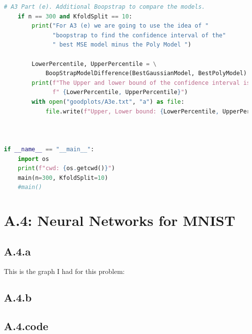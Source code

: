 \documentclass[]{article}
\begin{document}
\begin{lstlisting}[language=python]
    # A3 Part (e). Additional Boopstrap to compare the models.
    if n == 300 and KfoldSplit == 10:
        print("For A3 (e) we are going to use the idea of "
              "boopstrap to find the confidence interval of the"
              " best MSE model minus the Poly Model ")

        LowerPercentile, UpperPercentile = \
            BoopStrapModelDifference(BestGaussianModel, BestPolyModel)
        print(f"The Upper and lower bound of the confidence interval is:"
              f" {LowerPercentile, UpperPercentile}")
        with open("goodplots/A3e.txt", "a") as file:
            file.write(f"Upper, Lower bound: {LowerPercentile, UpperPercentile}")



if __name__ == "__main__":
    import os
    print(f"cwd: {os.getcwd()}")
    main(n=300, KfoldSplit=10)
    #main()
        \end{lstlisting}
\section*{A.4: Neural Networks for MNIST}
    \subsection*{A.4.a}
        This is the graph I had for this problem: 
    \subsection*{A.4.b} 
    \subsection*{A.4.code}


    
        
\end{document}
